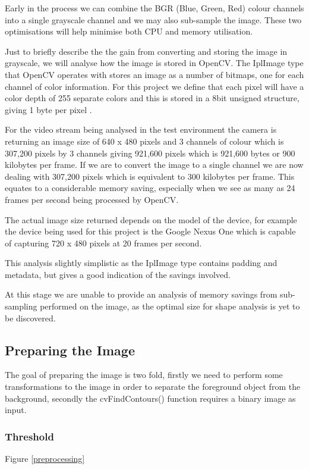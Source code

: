 Early in the process we can combine the BGR (Blue, Green, Red) colour channels into a single grayscale channel and we may also sub-sample the image. These two optimisations will help minimise both CPU and memory utilisation.

Just to briefly describe the the gain from converting and storing the image in grayscale, we will analyse how the image is stored in OpenCV. The IplImage type that OpenCV operates with stores an image as a number of bitmaps, one for each channel of color information. For this project we define that each pixel will have a color depth of 255 separate colors and this is stored in a 8bit unsigned structure, giving 1 byte per pixel \cite{morganIPL06}.

For the video stream being analysed in the test environment the camera is returning an image size of 640 x 480 pixels and 3 channels of colour which is 307,200 pixels by 3 channels giving 921,600 pixels which is 921,600 bytes or 900 kilobytes per frame.  If we are to convert the image to a single channel we are now dealing with 307,200 pixels which is equivalent to 300 kilobytes per frame. This equates to a considerable memory saving, especially when we see as many as 24 frames per second being processed by OpenCV.

The actual image size returned depends on the model of the device, for example the device being used for this project is the Google Nexus One which is capable of capturing 720 x 480 pixels at 20 frames per second.

This analysis slightly simplistic as the IplImage type contains padding and metadata, but gives a good indication of the savings involved.

At this stage we are unable to provide an analysis of memory savings from sub-sampling performed on the image, as the optimal size for shape analysis is yet to be discovered.


\subsection{Preparing the Image}
The goal of preparing the image is two fold, firstly we need to perform some transformations to the image in order to separate the foreground object from the background, secondly the cvFindContours() function requires a binary image as input.

\subsubsection{Threshold}
Figure \ref{preprocessing}

